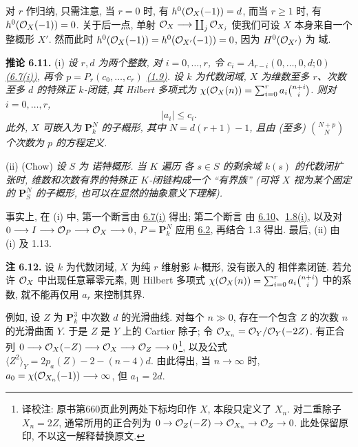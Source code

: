 对 $r$ 作归纳, 只需注意, 当 $r=0$ 时,
有 $h^0(\mathcal O_X(-1))=d$, 而当 $r\geq1$ 时, 有
$h^0(\mathcal O_X(-1))=0$. 关于后一点, 单射
$\mathcal O_X\longrightarrow\coprod_j\mathcal O_{X_j}$ 使我们可设 $X$
本身来自一个整概形 $X'$. 然而此时
$h^0(\mathcal O_X(-1))=h^0(\mathcal O_{X'}(-1))=0$, 因为 $H^0(\mathcal O_{X'})$ 为
域.

\textbf{推论 6.11.} (i) \emph{设 $r,d$ 为两个整数, 对 $i=0,\ldots,r$, 令
$c_i=A_{r-i}(0,\ldots,0,d;0)$ \hyperlink{sga6.e13.thm.6-7}{(6.7(i))}, 再令
$p=P_r(c_0,\ldots,c_r)$ \hyperlink{sga6.e13.def.1-9}{(1.9)}. 设 $k$ 为代数闭域,
$X$ 为维数至多 $r$、次数至多 $d$ 的特殊正 $k$-闭链,
其 Hilbert 多项式为
$\chi(\mathcal O_X(n))=\sum_{i=0}^{r}a_i\binom{n+i}{i}$. 则对
$i=0,\ldots,r$,}
\[
  |a_i|\leq c_i.
\]
\emph{此外, $X$ 可嵌入为 $\mathbf P^N_k$ 的子概形, 其中
$N=d(r+1)-1$, 且由 (至多) $\binom{N+p}{N}$ 个次数为
$p$ 的方程定义.}

(ii) (Chow) \emph{设 $S$ 为 诺特概形. 当 $K$ 遍历
各 $s\in S$ 的剩余域 $k(s)$ 的代数闭扩张时,
维数和次数有界的特殊正 $K$-闭链构成一个
“有界族” (可将 $X$ 视为某个固定的
$\mathbf P^N_S$ 的子概形, 也可以在显然的抽象意义下理解).}

事实上, 在 (i) 中, 第一个断言由 \hyperlink{sga6.e13.thm.6-7}{6.7(i)} 得出; 第二个断言
由 \hyperlink{sga6.e13.lem.6-10}{6.10}、\hyperlink{sga6.e13.prop.1-8}{1.8(i)}, 以及对
$0\longrightarrow I\longrightarrow\mathcal O_P\longrightarrow\mathcal O_X\longrightarrow0$,
$P=\mathbf P^N_k$ 应用 \hyperlink{sga6.e13.lem.6-2}{6.2}, 再结合 1.3 得出. 最后, (ii) 由 (i) 及
1.13.

\textbf{注 6.12.} 设 $k$ 为代数闭域,
$X$ 为纯 $r$ 维射影 $k$-概形, 没有嵌入的
相伴素闭链. 若允许 $\mathcal O_X$ 中出现任意幂零元素,
则 Hilbert 多项式
$\chi(\mathcal O_X(n))=\sum_{i=0}^{r}a_i\binom{n+i}{i}$ 中的系数, 就不能再仅用
$a_r$ 来控制其界.

例如, 设 $Z$ 为 $\mathbf P^3_k$ 中次数 $d$ 的光滑曲线.
对每个 $n\gg0$, 存在一个包含 $Z$ 的次数 $n$ 的光滑曲面 $Y$.
于是 $Z$ 是 $Y$ 上的 Cartier 除子; 令
$\mathcal O_{X_n}=\mathcal O_Y/\mathcal O_Y(-2Z)$. 有正合列
$0\longrightarrow\mathcal O_X(-Z)\longrightarrow
\mathcal O_X\longrightarrow\mathcal O_Z\longrightarrow0$\footnote{译校注: 原书第660页此列两处下标均印作 $X$, 本段只定义了 $X_n$. 对二重除子 $X_n=2Z$, 通常所用的正合列为 $0\to\mathcal O_Z(-Z)\to\mathcal O_{X_n}\to\mathcal O_Z\to0$. 此处保留原印, 不以这一解释替换原文.}, 以及公式
$\langle Z^2\rangle_Y=2p_a(Z)-2-(n-4)d$. 由此得出, 当 $n\longrightarrow\infty$ 时,
$a_0=\chi(\mathcal O_{X_n}(-1))\longrightarrow\infty$,
但 $a_1=2d$.

